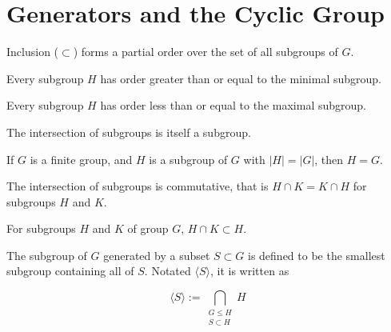 \section{Generators and the Cyclic Group}

\begin{theorem}
    \label{theorem : PartialOrder (Subgroup G)}
    Inclusion ($\subset$) forms a partial order over the set of all subgroups of $G$.
\end{theorem}

\begin{theorem}
    \label{theorem : Minimal_smallest}
    \leanok
    Every subgroup $H$ has order greater than or equal to the minimal subgroup.
\end{theorem}

\begin{theorem}
    \label{theorem : Maximal_largest}
    \leanok
    Every subgroup $H$ has order less than or equal to the maximal subgroup.
\end{theorem}

\begin{theorem}
    \label{definition : Intersect}
    \leanok
    The intersection of subgroups is itself a subgroup.
\end{theorem}

\begin{theorem}
    \label{definition : subgroup_eq_Maximal_of_card_eq_G}
    If $G$ is a finite group, and $H$ is a subgroup of $G$ with $|H| = |G|$, then $H = G$.
\end{theorem}

\begin{theorem}
    \label{theorem : inter_comm}
    The intersection of subgroups is commutative, that is $H \cap K = K \cap H$ for subgroups $H$ and $K$.
\end{theorem}

\begin{theorem}
    \label{theorem : le_intersect_self}
    For subgroups $H$ and $K$ of group $G$, $H \cap K \subset H$.
\end{theorem}

\begin{definition}
    \label{definition : Generate}
    \leanok
    The subgroup of $G$ generated by a subset $S \subset G$ is defined to be the smallest subgroup containing all of $S$. Notated $\langle S \rangle$, it is written as

    \begin{equation*}
        \langle S \rangle := \bigcap_{\substack{G \le H \\ S \subset H}} H
    \end{equation*}
\end{definition}

